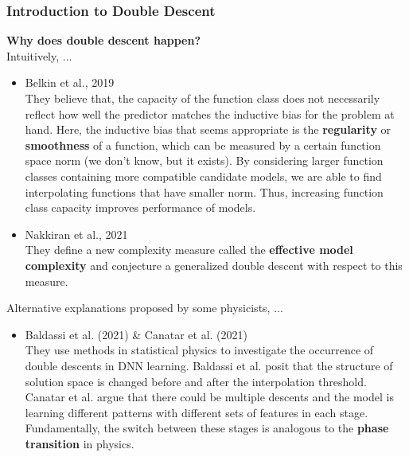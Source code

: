 \documentclass{beamer}
\begin{document}
	\begin{frame}[t]
		\frametitle{Introduction to Double Descent}
		\scriptsize
		\textbf{\small Why does double descent happen?}\\
		
		\vspace{1mm}
		Intuitively, ...
		\begin{itemize}
			\justifying
			\item Belkin et al., 2019 \cite{belkin2019reconciling}\\
			They believe that, the capacity of the function class does not necessarily reflect how well the predictor matches the inductive bias for the problem at hand. Here, the inductive bias that seems appropriate is the \textbf{regularity} or \textbf{smoothness} of a function, which can be measured by a certain function space norm (we don't know, but it exists). By considering larger function classes containing more compatible candidate models, we are able to find interpolating functions that have smaller norm. Thus, increasing function class capacity improves performance of models.\\
			
			\item Nakkiran et al., 2021 \cite{nakkiran2021deep}\\
			They define a new complexity measure called the \textbf{effective model complexity} and conjecture a generalized double descent with respect to this measure.
		\end{itemize}
	
		Alternative explanations proposed by some physicists, ...
		\begin{itemize}
			\justifying
			\item Baldassi et al. (2021) \cite{baldassi2021unveiling} \& Canatar et al. (2021) \cite{canatar2021spectral} \\
			They use methods in statistical physics to investigate the occurrence of double descents in DNN learning. Baldassi et al. posit that the structure of solution space is changed before and after the interpolation threshold. Canatar et al. argue that there could be multiple descents and the model is learning different patterns with different sets of features in each stage. Fundamentally, the switch between these stages is analogous to the \textbf{phase transition} in physics.
		\end{itemize}
		\vspace{1mm}
	\end{frame}
	
\end{document}
